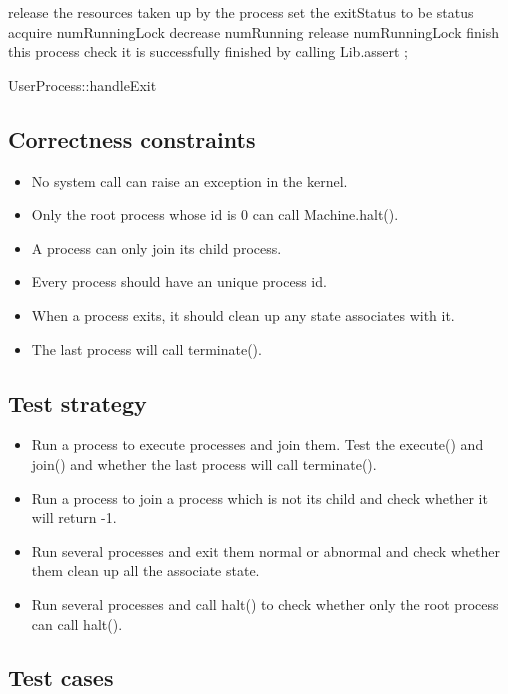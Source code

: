 \documentclass[a4paper,10pt]{article}
\begin{document}
\begin{algorithm}
\DontPrintSemicolon
{}
release the resources taken up by the process\;
set the exitStatus to be status\;
acquire numRunningLock\;
decrease numRunning\;
release numRunningLock\;
finish this process\;
check it is successfully finished by calling Lib.assert\;
;
\caption{UserProcess::handleExit}
\label{algo:exit}
\end{algorithm}



\subsection{Correctness constraints}
\begin{itemize}
\item No system call can raise an exception in the kernel.
\item Only the root process whose id is 0 can call Machine.halt().
\item A process can only join its child process.
\item Every process should have an unique process id.
\item When a process exits, it should clean up any state associates with it.
\item The last process will call terminate().
\end{itemize}

\subsection{Test strategy}

\begin{itemize}
\item Run a process to execute processes and join them. Test the execute() and join() and whether the last process will call terminate().
\item Run a process to join a process which is not its child and check whether it will return -1.
\item Run several processes and exit them normal or abnormal and check whether them clean up all the associate state.
\item Run several processes and call halt() to check whether only the root process can call halt().
\end{itemize}

\subsection{Test cases}
\end{document}
